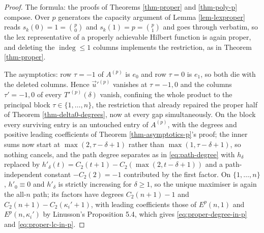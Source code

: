 \documentclass[11pt, a4paper, abstract=yes]{scrartcl}
\theoremstyle{definition}
\theoremstyle{remark}
\theoremstyle{plain}
\newcommand{\indeg}{\operatorname{indeg}}
\begin{document}
\begin{proof}
The formula: the proofs of Theorems \ref{thm-proper} and \ref{thm-poly-p} compose. Over \(p\)
generators the capacity argument of Lemma \ref{lem-lexproper} reads \(s_k(0)=1=\binom p0\) and
\(s_k(1)=p=\binom p1\) and goes through verbatim, so the lex representative of a properly
achievable Hilbert function is again proper, and deleting the \(\indeg\le1\) columns implements
the restriction, as in Theorem \ref{thm-proper}.

The asymptotics: row \(\tau=-1\) of \(A^{(p)}\) is \(e_0\) and row \(\tau=0\) is \(e_1\), so both
die with the deleted columns. Hence \(\vec u'^{(p)}\) vanishes at \(\tau=-1,0\) and the columns
\(\tau'=-1,0\) of every \(T'^{(p)}(\delta)\) vanish, confining the whole product to the principal
block \(\tau\in\lbrace1,\dots,n\rbrace\), the restriction that already repaired the proper half of
Theorem \ref{thm-delta0-degrees}, now at every gap simultaneously. On the block every surviving
entry is an untouched entry of \(A^{(p)}\), with the degrees and positive leading coefficients of
Theorem \ref{thm-asymptotics-p}'s proof; the inner sums now start at \(\max(2,\tau-\delta+1)\)
rather than \(\max(1,\tau-\delta+1)\), so nothing cancels, and the path degree separates as in
\eqref{eq:path-degree} with \(h_\delta\) replaced by
\(h'_\delta(t)=C_2(t+1)-C_2(\max(2,t-\delta+1))\) and a path-independent constant \(-C_2(2)=-1\)
contributed by the first factor. On \(\lbrace1,\dots,n\rbrace\), \(h'_0\equiv0\) and \(h'_\delta\)
is strictly increasing for \(\delta\ge1\), so the unique maximiser is again the all-\(n\) path;
its factors have degrees \(C_2(n+1)-1\) and \(C_2(n+1)-C_2(\kappa_i'+1)\), with leading
coefficients those of \(E^p(n,1)\) and \(E^p(n,\kappa_i')\) by Linusson's Proposition 5.4, which
gives \eqref{eq:proper-degree-in-p} and \eqref{eq:proper-lc-in-p}.
\end{proof}
\end{document}
